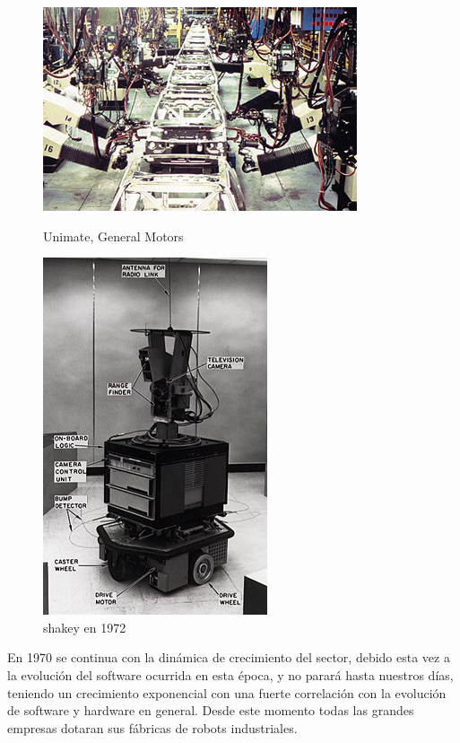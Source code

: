 \begin{figure}[!htb]
	\begin{minipage}{0.48\textwidth}
    	\centering
     	\includegraphics[scale=0.6]{img/unimate.jpg}
  		\caption{Unimate, General Motors}
  		\label{fig:unimate}
   	\end{minipage}\hfill
   	\begin {minipage}{0.48\textwidth}
     	\centering
     	\includegraphics[scale=0.6]{img/shakey.jpg}
     	\caption{shakey en 1972}
     	\label{fig:shakey}
	\end{minipage}
\end{figure}

En 1970 se continua con la dinámica de crecimiento del sector, debido esta vez a la evolución del software ocurrida en esta época, y no parará hasta nuestros días, teniendo un crecimiento exponencial con una fuerte correlación con la evolución de software y hardware en general.
Desde este momento todas las grandes empresas dotaran sus fábricas de robots industriales. 

